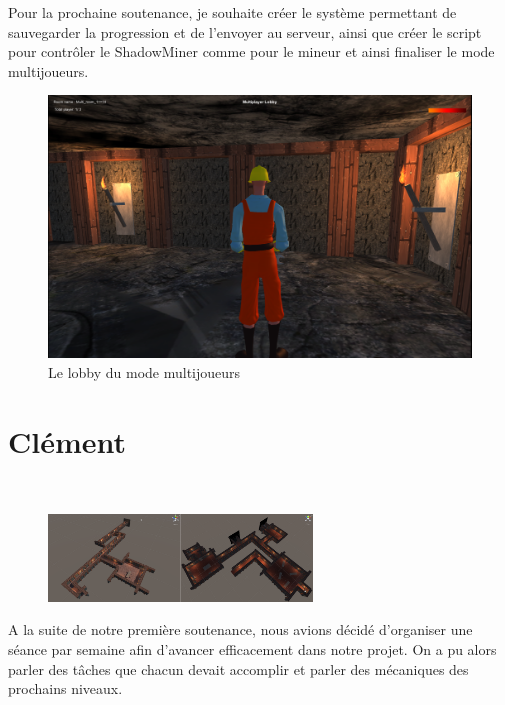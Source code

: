 \documentclass[titlepage, 13px, a4paper]{report}
\begin{document}
Pour la prochaine soutenance, je souhaite créer le système permettant de sauvegarder la progression et de l’envoyer au 
serveur, ainsi que créer le script pour contrôler le ShadowMiner comme pour le mineur et ainsi finaliser le mode multijoueurs. \\

\begin{figure}[!b]
\centering 
\includegraphics[width=12cm]{image/cedric_multi_lobby.png}
\caption{Le lobby du mode multijoueurs}
\end{figure}



\newpage




\section{Clément}
\paragraph{} \hspace{0pt} \\
\begin{figure}
\includegraphics[width=7cm]{image/clement_map_Final.png}
\end{figure}
A la suite de notre première soutenance, nous avions décidé d'organiser une séance par semaine afin d'avancer efficacement dans notre projet.
On a pu alors parler des tâches que chacun devait accomplir et parler des mécaniques des prochains niveaux. \\ \\
\end{document}
